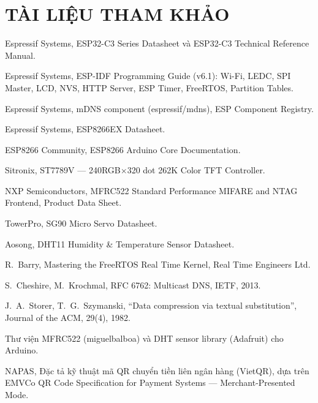 \documentclass[12pt,letterpaper]{report}
\newcommand{\codeus}{\textunderscore\allowbreak}
\newcommand{\code}[1]{{\ttfamily\let\_\codeus #1}}
\begin{document}
\cleardoublepage{}
{\listoftables}
\cleardoublepage{}
{\listoffigures}








\chapter*{TÀI LIỆU THAM KHẢO}
\begin{enumerate}[label={[\arabic*]}]
\item Espressif Systems, ESP32-C3 Series Datasheet và ESP32-C3 Technical
  Reference Manual.
\item Espressif Systems, ESP-IDF Programming Guide (v6.1): Wi-Fi, LEDC, SPI
  Master, LCD, NVS, HTTP Server, ESP Timer, FreeRTOS, Partition Tables.
\item Espressif Systems, mDNS component (\code{espressif/mdns}), ESP Component
  Registry.
\item Espressif Systems, ESP8266EX Datasheet.
\item ESP8266 Community, ESP8266 Arduino Core Documentation.
\item Sitronix, ST7789V — 240RGB$\times$320 dot 262K Color TFT Controller.
\item NXP Semiconductors, MFRC522 Standard Performance MIFARE and NTAG
  Frontend, Product Data Sheet.
\item TowerPro, SG90 Micro Servo Datasheet.
\item Aosong, DHT11 Humidity \& Temperature Sensor Datasheet.
\item R.~Barry, Mastering the FreeRTOS Real Time Kernel, Real Time Engineers Ltd.
\item S.~Cheshire, M.~Krochmal, RFC 6762: Multicast DNS, IETF, 2013.
\item J.~A.~Storer, T.~G.~Szymanski, ``Data compression via textual substitution'',
  Journal of the ACM, 29(4), 1982.
\item Thư viện MFRC522 (miguelbalboa) và DHT sensor library (Adafruit)
  cho Arduino.
\item NAPAS, Đặc tả kỹ thuật mã QR chuyển tiền liên ngân hàng (VietQR), dựa trên EMVCo
  QR Code Specification for Payment Systems — Merchant-Presented Mode.

\end{enumerate}
\end{document}
